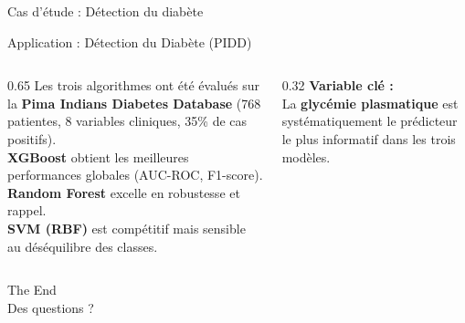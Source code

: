 \documentclass[11pt]{beamer}
\begin{document}
\begin{frame}{Cas d'étude : Détection du diabète}
    \vspace{5pt}
    \begin{block}{Application : Détection du Diabète (PIDD)}
        \vspace{6pt}
        \begin{columns}[T]
        \begin{column}{0.65\textwidth}
            Les trois algorithmes ont été évalués sur la \textbf{Pima Indians Diabetes Database} (768 patientes, 8 variables cliniques, 35\% de cas positifs).\\[2pt]
            \textbf{XGBoost} obtient les meilleures performances globales (AUC-ROC, F1-score).\\
            \textbf{Random Forest} excelle en robustesse et rappel.\\
            \textbf{SVM (RBF)} est compétitif mais sensible au déséquilibre des classes.
        \end{column}
        \begin{column}{0.32\textwidth}
            \textbf{Variable clé :}\\[2pt]
            La \textbf{glycémie plasmatique} est systématiquement le prédicteur le plus informatif dans les trois modèles.
        \end{column}
        \end{columns}
    \end{block}
\end{frame}

\begin{frame}{The End}
    \centering
    \\[1cm]
    \huge Des questions ?
\end{frame}
\end{document}
